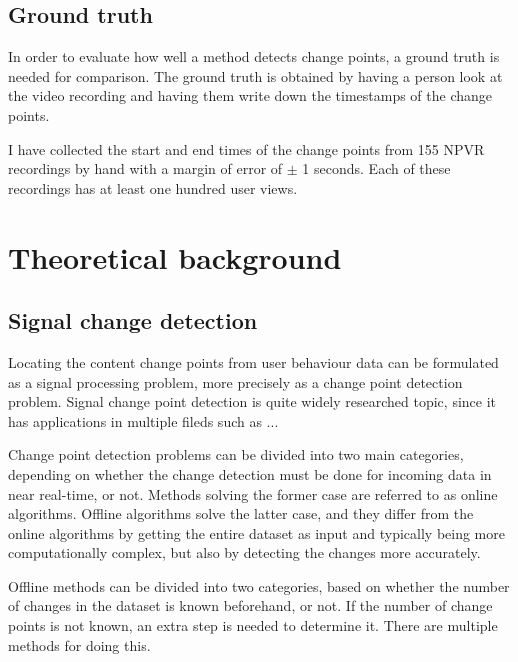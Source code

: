 \subsection{Ground truth} \label{subsec:groundtruth}

In order to evaluate how well a method detects change points, a ground truth is needed for comparison. The ground truth is obtained by having a person look at the video recording and having them write down the timestamps of the change points.

I have collected the start and end times of the change points from 155 NPVR recordings by hand with a margin of error of $\pm$ 1 seconds. Each of these recordings has at least one hundred user views.

\section{Theoretical background} \label{sec:background}

\subsection{Signal change detection} \label{subsec:methods} %


Locating the content change points from user behaviour data can be formulated as a signal processing problem, more precisely as a change point detection problem. Signal change point detection is quite widely researched topic, since it has applications in multiple fileds such as ... %

Change point detection problems can be divided into two main categories, depending on whether the change detection must be done for incoming data in near real-time, or not. Methods solving the former case are referred to as online algorithms. Offline algorithms solve the latter case, and they differ from the online algorithms by getting the entire dataset as input and typically being more computationally complex, but also by detecting the changes more accurately.

Offline methods can be divided into two categories, based on whether the number of changes in the dataset is known beforehand, or not. If the number of change points is not known, an extra step is needed to determine it. There are multiple methods for doing this.


